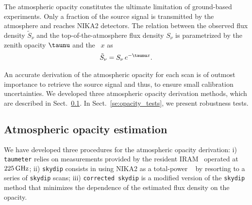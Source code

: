 
The atmospheric opacity constitutes the ultimate limitation of
ground-based experiments. Only a fraction of the source 
signal is transmitted by the atmosphere and reaches NIKA2 detectors. 
The relation between the observed flux density
$\tilde{S}_{\nu}$ and the top-of-the-atmosphere flux density $S_{\nu}$
is parametrized by the zenith opacity $\taunu$
and the \airmass\ $x$ as %
\begin{equation}
\tilde{S}_{\nu} = S_{\nu} \, e^{-\taunu  x}.
\label{eq:uncorr_flux}
\end{equation}

An accurate derivation of the atmospheric opacity for each scan is
of outmost importance to retrieve the source signal and thus, to
ensure small calibration uncertainties.
We developed three atmospheric opacity derivation methods, which are described in
Sect.~\ref{se:opacity_methods}. In Sect.~\ref{se:opacity_tests}, we
present robustness tests.

\subsection{Atmospheric opacity estimation}
\label{se:opacity_methods}

We have developed three procedures for the atmospheric opacity
derivation: i) {\tt taumeter} relies on measurements
provided by the resident IRAM \taumeter\ operated at $225\,\rm{GHz}$;
ii) {\tt skydip} consists in using NIKA2 as a total-power \taumeter\ 
by resorting to a series of {\tt skydip} scans;
iii) {\tt corrected skydip} is a modified
version of the {\tt skydip} method that minimizes the dependence of the
estimated flux density on the opacity.

